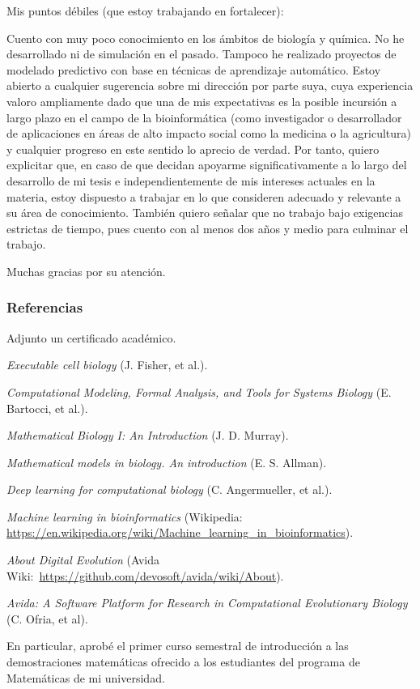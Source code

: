 \documentclass[12pt]{article}
\begin{document}
	Mis puntos débiles (que estoy trabajando en fortalecer):

	Cuento con muy poco conocimiento en los ámbitos de biología y química.
	No he desarrollado  ni de simulación en
	el pasado. Tampoco he realizado proyectos de modelado predictivo con
	base en técnicas de aprendizaje automático. Estoy abierto a cualquier
	sugerencia sobre mi dirección por parte suya, cuya experiencia
	valoro ampliamente dado que una de mis expectativas es la posible
	incursión a largo plazo en el campo de la bioinformática (como
	investigador o desarrollador de aplicaciones en áreas de alto impacto
	social como la medicina o la agricultura) y cualquier progreso en este
	sentido lo aprecio de verdad. Por tanto, quiero explicitar que, en caso
	de que decidan apoyarme significativamente a lo largo del desarrollo de
	mi tesis e independientemente de mis intereses actuales en la materia,
	estoy dispuesto a trabajar en lo que consideren adecuado y relevante a
	su área de conocimiento. También quiero señalar que no trabajo bajo
	exigencias estrictas de tiempo, pues cuento con al menos dos años y
	medio para culminar el trabajo.

	Muchas gracias por su atención.

	\subsubsection*{Referencias}

	\begin{enumerate}[label={[\arabic*]}]
	\item Adjunto un certificado académico.
	\item \textit{Executable cell biology} (J. Fisher, et al.).
	\item \textit{Computational Modeling, Formal Analysis, and Tools for
		Systems Biology} (E. Bartocci, et al.).
	\item \textit{Mathematical Biology I: An Introduction} (J. D. Murray).
	\item \textit{Mathematical models in biology. An introduction}
		(E. S. Allman).
	\item \textit{Deep learning for computational biology}
		(C. Angermueller, et al.).
	\item \textit{Machine learning in bioinformatics} (Wikipedia:
	\url{https://en.wikipedia.org/wiki/Machine_learning_in_bioinformatics}).
\item \textit{About Digital Evolution} (Avida Wiki:\ 
	\url{https://github.com/devosoft/avida/wiki/About}).
	\item \textit{Avida: A Software Platform for Research in Computational
		Evolutionary Biology} (C. Ofria, et al).
	\item En particular, aprobé el primer curso semestral de introducción a
		las demostraciones matemáticas ofrecido a los estudiantes del
		programa de Matemáticas de mi universidad.
	\end{enumerate}
\end{document}
